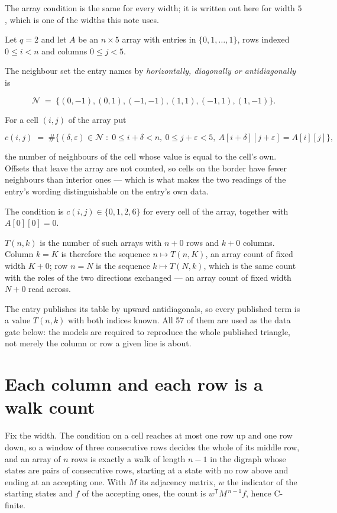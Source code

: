 \documentclass[11pt]{article}
\theoremstyle{definition}
\begin{document}
The array condition is the same for every width; it is written out here for width $5$, which is one of the widths this note uses.

Let $q = 2$ and let $A$ be an $n \times 5$ array with entries in $\{0,1,\dots,1\}$, rows indexed $0 \le i < n$ and columns $0 \le j < 5$.

The neighbour set the entry names by {\itshape horizontally, diagonally or antidiagonally} is

\[\mathcal{N} \;=\; \{(0,-1), (0,1), (-1,-1), (1,1), (-1,1), (1,-1)\}.\]

For a cell $(i,j)$ of the array put

\[c(i,j) \;=\; \#\bigl\{(\delta,\varepsilon)\in\mathcal{N} \;:\; 0\le i+\delta<n,\ 0\le j+\varepsilon<5,\ A[i+\delta][j+\varepsilon] = A[i][j]\bigr\},\]

the number of neighbours of the cell whose value is equal to the cell's own. Offsets that leave the array are not counted, so cells on the border have fewer neighbours than interior ones --- which is what makes the two readings of the entry's wording distinguishable on the entry's own data.

The condition is $c(i,j) \in \{0, 1, 2, 6\}$ for every cell of the array, together with $A[0][0]=0$.

$T(n,k)$ is the number of such arrays with $n + 0$ rows and $k + 0$ columns. Column $k = K$ is therefore the sequence $n \mapsto T(n,K)$, an array count of fixed width $K + 0$; row $n = N$ is the sequence $k \mapsto T(N,k)$, which is the same count with the roles of the two directions exchanged --- an array count of fixed width $N + 0$ read across.

The entry publishes its table by upward antidiagonals, so every published term is a value $T(n,k)$ with both indices known. All 57 of them are used as the data gate below: the models are required to reproduce the whole published triangle, not merely the column or row a given line is about.

\section{Each column and each row is a walk count}

Fix the width. The condition on a cell reaches at most one row up and one row down, so a window of three consecutive rows decides the whole of its middle row, and an array of $n$ rows is exactly a walk of length $n-1$ in the digraph whose states are pairs of consecutive rows, starting at a state with no row above and ending at an accepting one. With $M$ its adjacency matrix, $w$ the indicator of the starting states and $f$ of the accepting ones, the count is $w^{\mathsf T}M^{\,n-1}f$, hence C-finite.
\end{document}
